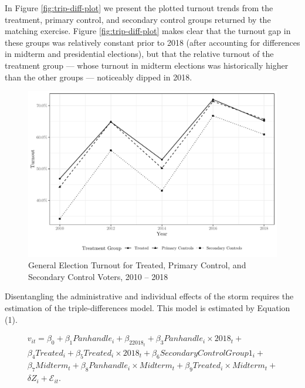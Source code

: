 \documentclass[
  12pt,
]{article}
\begin{document}
In Figure \ref{fig:trip-diff-plot} we present the plotted turnout trends from the treatment, primary control, and secondary control groups returned by the matching exercise. Figure \ref{fig:trip-diff-plot} makes clear that the turnout gap in these groups was relatively constant prior to 2018 (after accounting for differences in midterm and presidential elections), but that the relative turnout of the treatment group --- whose turnout in midterm elections was historically higher than the other groups --- noticeably dipped in 2018.

\begin{figure}[H]

{\centering \includegraphics{hurricane_michael_files/figure-latex/tripd-to-chunk-1} 

}

\caption{\label{fig:trip-diff-plot}General Election Turnout for Treated, Primary Control, and Secondary Control Voters, 2010 -- 2018}\label{fig:tripd-to-chunk}
\end{figure}

Disentangling the administrative and individual effects of the storm requires the estimation of the triple-differences model. This model is estimated by Equation (1).

\begin{gather}
\label{eq:1}
v_{it}=\beta_0+\beta_1Panhandle_{i}+\beta_22018_{t}+\beta_3Panhandle_{i}\times 2018_{t} + \nonumber \\
\beta_4Treated_{i} + \beta_5Treated_{i}\times 2018_{t} + \beta_6Secondary Control Group 1_{i} + \\
\beta_7Midterm_{t} + \beta_8Panhandle_{i}\times Midterm_{t} + \beta_9Treated_{i}\times Midterm_{t} + \nonumber \\
\delta{Z}_{i} + \mathcal{E}_{it}. \nonumber
\end{gather}
\end{document}
